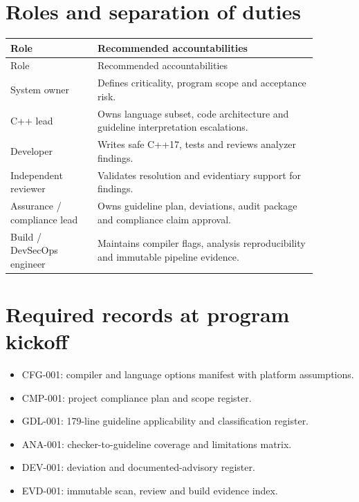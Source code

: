 \documentclass[10pt,letterpaper]{article}
\begin{document}
\section{Roles and separation of duties}
\small\setlength{\tabcolsep}{3pt}\renewcommand{\arraystretch}{1.15}
\begin{longtable}{p{0.25\linewidth}p{0.63\linewidth}}
\toprule
Role & Recommended accountabilities\\ \midrule
\endfirsthead
\toprule
Role & Recommended accountabilities\\ \midrule
\endhead
System owner & Defines criticality, program scope and acceptance risk.\\
C++ lead & Owns language subset, code architecture and guideline interpretation escalations.\\
Developer & Writes safe C++17, tests and reviews analyzer findings.\\
Independent reviewer & Validates resolution and evidentiary support for findings.\\
Assurance / compliance lead & Owns guideline plan, deviations, audit package and compliance claim approval.\\
Build / DevSecOps engineer & Maintains compiler flags, analysis reproducibility and immutable pipeline evidence.\\
\bottomrule
\end{longtable}
\normalsize

\section{Required records at program kickoff}
\begin{itemize}
\item CFG-001: compiler and language options manifest with platform assumptions.
\item CMP-001: project compliance plan and scope register.
\item GDL-001: 179-line guideline applicability and classification register.
\item ANA-001: checker-to-guideline coverage and limitations matrix.
\item DEV-001: deviation and documented-advisory register.
\item EVD-001: immutable scan, review and build evidence index.
\end{itemize}
\end{document}
